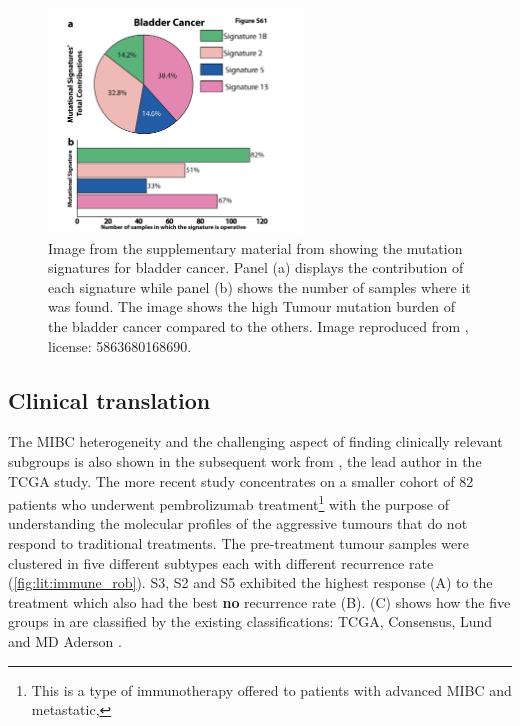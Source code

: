 \begin{figure}[!htb]    
    \centering
    \includegraphics[width=0.6\textwidth,height=0.6\textheight,keepaspectratio]{Sections/Lit_review/Resources/bladder_mut_sig.png}
    \caption[Bladder mutational signature]{Image from the supplementary material from \citeauthor{Alexandrov2013-gi} showing the mutation signatures for bladder cancer. Panel (a) displays the contribution of each signature while panel (b) shows the number of samples where it was found. The image shows the high Tumour mutation burden of the bladder cancer compared to the others. Image reproduced from \citep{Alexandrov2013-gi}, license: 5863680168690. }
    \label{fig:lit:bladder_mut_sig}
\end{figure}



\subsection{Clinical translation} \label{s:lit:clinical}


The MIBC heterogeneity and the challenging aspect of finding clinically relevant subgroups is also shown in the subsequent work from \citeauthor{Robertson2023-na}, the lead author in the TCGA study. The more recent study concentrates on a smaller cohort of 82 patients who underwent pembrolizumab treatment\footnote{This is a type of immunotherapy offered to patients with advanced MIBC and metastatic,} with the purpose of understanding the molecular profiles of the aggressive tumours that do not respond to traditional treatments. The pre-treatment tumour samples were clustered in five different subtypes each with different recurrence rate (\cref{fig:lit:immune_rob}). S3, S2 and S5 exhibited the highest response (A) to the treatment which also had the best \textbf{no} recurrence rate (B).  (C) shows how the five groups in \cite{Robertson2023-na} are classified by the existing classifications: TCGA, Consensus, Lund and MD Aderson \citep{Robertson2017-mg,Kamoun2020-tj,Marzouka2018-ge,Dadhania2016-cb}. 

